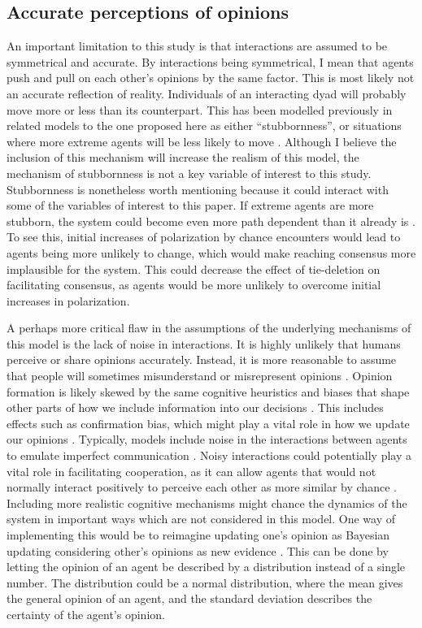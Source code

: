 \documentclass{article}
\begin{document}
\subsection{Accurate perceptions of opinions}

An important limitation to this study is that interactions are assumed to be symmetrical and accurate. 
By interactions being symmetrical, I mean that agents push and pull on each other’s opinions by the same factor. 
This is most likely not an accurate reflection of reality. 
Individuals of an interacting dyad will probably move more or less than its counterpart. 
This has been modelled previously in related models to the one proposed here as either “stubbornness”, or situations where more extreme agents will be less likely to move \cite{flache_models_2017,ghaderi_opinion_2014,yildiz_binary_2013}. 
Although I believe the inclusion of this mechanism will increase the realism of this model, the mechanism of stubbornness is not a key variable of interest to this study. 
Stubbornness is nonetheless worth mentioning because it could interact with some of the variables of interest to this paper. 
If extreme agents are more stubborn, the system could become even more path dependent than it already is \cite{turner_paths_2018}. 
To see this, initial increases of polarization by chance encounters would lead to agents being more unlikely to change, which would make reaching consensus more implausible for the system. This could decrease the effect of tie-deletion on facilitating consensus, as agents would be more unlikely to overcome initial increases in polarization. 

A perhaps more critical flaw in the assumptions of the underlying mechanisms of this model is the lack of noise in interactions. 
It is highly unlikely that humans perceive or share opinions accurately. 
Instead, it is more reasonable to assume that people will sometimes misunderstand or misrepresent opinions \cite{jussim_influence_1989}. 
Opinion formation is likely skewed by the same cognitive heuristics and biases that shape other parts of how we include information into our decisions \cite{arceneaux_cognitive_2012}. This includes effects such as confirmation bias, which might play a vital role in how we update our opinions \cite{allahverdyan_opinion_2014}. 
Typically, models include noise in the interactions between agents to emulate imperfect communication \cite{sirbu2017opinion,su_noise_2017}. Noisy interactions could potentially play a vital role in facilitating cooperation, as it can allow agents that would not normally interact positively to perceive each other as more similar by chance \cite{allahverdyan_opinion_2014,su_noise_2017}. Including more realistic cognitive mechanisms might chance the dynamics of the system in important ways which are not considered in this model. 
One way of implementing this would be to reimagine updating one’s opinion as Bayesian updating considering other’s opinions as new evidence \cite{allahverdyan_opinion_2014}. This can be done by letting the opinion of an agent be described by a distribution instead of a single number. The distribution could be a normal distribution, where the mean gives the general opinion of an agent, and the standard deviation describes the certainty of the agent’s opinion.  
\end{document}
